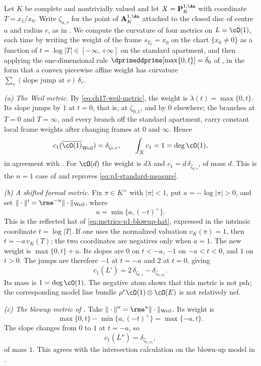 \begin{example}
\label{ex:ch17-weil-curvature}
Let $K$ be complete and nontrivially valued and let
$X=\mathbf P^{1,\An}_K$ with coordinate $T=x_1/x_0$.  Write
$\zeta_{a,r}$ for the point of $\mathbf A^{1,\An}_K$ attached to the
closed disc of centre $a$ and radius $r$, as in
.  We compute the curvature of four
metrics on $L=\cO(1)$, each time by writing the weight of the frame
$s_{T_0}=x_0$ on the chart $\{x_0\ne0\}$ as a function of
$t=\log|T|\in[-\infty,+\infty]$ on the standard apartment, and then
applying the one-dimensional rule
$\dprimeddprime[\max\{0,t\}]=\delta_{0}$ of
, in the form that a convex piecewise
affine weight has curvature $\sum_v(\text{slope jump at }v)\,\delta_v$.

\emph{(a) The Weil metric.}  By \eqref{eq:ch17-weil-metric}, the weight is
$\lambda(t)=\max\{0,t\}$.  Its slope jumps by $1$ at $t=0$, that is,
at $\zeta_{0,1}$, and by $0$ elsewhere; the branches at
$T=0$ and $T=\infty$, and every branch off the standard apartment, carry
constant local frame weights after changing frames at $0$ and $\infty$.
Hence
\[
 c_1(\overline{\cO(1)}_{\mathrm{Weil}})=\delta_{\zeta_{0,1}},
 \qquad
 \int_Xc_1=1=\deg\cO(1),
\]
in agreement with .  For $\cO(d)$ the
weight is $d\lambda$ and $c_1=d\,\delta_{\zeta_{0,1}}$, of mass $d$.
This is the $n=1$ case of  and reproves
\eqref{eq:p1-standard-measure}.

\emph{(b) A shifted formal metric.}  Fix $\pi\in K^\times$ with
$|\pi|<1$, put $a=-\log|\pi|>0$, and set
$\|\cdot\|'=\rme^{-u}\|\cdot\|_{\mathrm{Weil}}$, where
\[
                         u=\min\{a,(-t)^+\}.
\]
This is the reflected hat of \eqref{eq:metrics-p1-blowup-hat}, expressed
in the intrinsic coordinate $t=\log|T|$.  If one uses the normalized
valuation $v_K(\pi)=1$, then $t=-a\,v_K(T)$; the two coordinates are
negatives only when $a=1$.  The new weight is
$\max\{0,t\}+u$.  Its slopes are $0$ on $t<-a$, $-1$ on
$-a<t<0$, and $1$ on $t>0$.  The jumps are therefore $-1$ at
$t=-a$ and $2$ at $t=0$, giving
\[
 c_1(\overline L')=2\,\delta_{\zeta_{0,1}}
                  -\delta_{\zeta_{0,|\pi|}}.
\]
Its mass is $1=\deg\cO(1)$.  The negative atom shows that this metric
is not psh; the corresponding model line bundle
$\rho^*\cO(1)\otimes\cO(E)$ is not relatively nef.

\emph{(c) The blowup metric of .}  Take
$\|\cdot\|''=\rme^{u}\|\cdot\|_{\mathrm{Weil}}$.  Its weight is
\[
             \max\{0,t\}-\min\{a,(-t)^+\}=\max\{-a,t\}.
\]
The slope changes from $0$ to $1$ at $t=-a$, so
\[
                  c_1(\overline L'')=\delta_{\zeta_{0,|\pi|}},
\]
of mass $1$.  This agrees with the intersection calculation on the
blown-up model in .


\end{example}

